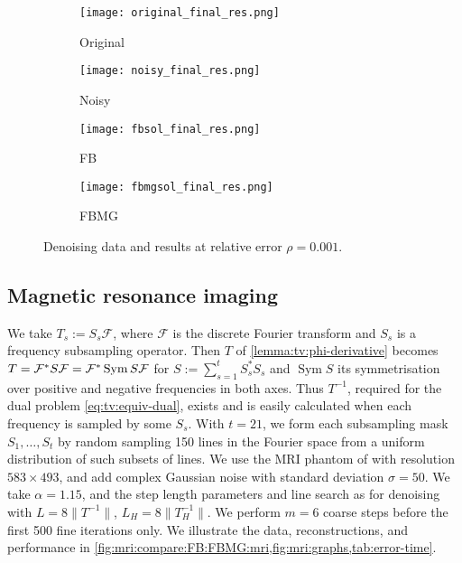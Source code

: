 \documentclass[a4paper,english]{jnsao}
\theoremstyle{definition}
\numberwithin{algorithm}{section}
\def\norm#1{\|#1\|}
\def\defeq{:=}
\DeclareMathOperator{\Sym}{Sym}
\let\Re\relax\DeclareMathOperator{\Re}{Re}
\def\relerr{\rho}
\begin{document}
\begin{figure}[t]
    \centering
    \begin{subfigure}{.2\textwidth}
        \centering
        \texttt{[image: original\_final\_res.png]}
        \caption{Original}
        \label{fig:original:image}
    \end{subfigure}%
    \begin{subfigure}{.2\textwidth}
        \centering
        \texttt{[image: noisy\_final\_res.png]}
        \caption{Noisy}
        \label{fig:noisy:image}
    \end{subfigure}
    \begin{subfigure}{.2\textwidth}
        \centering
        \texttt{[image: fbsol\_final\_res.png]}
        \caption{FB}
        \label{fig:fb:solution:image}
    \end{subfigure}%
    \begin{subfigure}{.2\textwidth}
        \centering
        \texttt{[image: fbmgsol\_final\_res.png]}
        \caption{FBMG}
        \label{fig:fbmg:solution:image}
    \end{subfigure}%
    \caption{Denoising data and results at relative error $\relerr= 0.001$.
    }
    \label{fig:denoising:compare:FB:FBMG}
\end{figure}

\subsection{Magnetic resonance imaging}
\label{sec:numerical:mri}

We take $T_s \defeq S_s\mathcal{F}$, where $\mathcal{F}$ is the discrete Fourier transform and $S_s$ is a frequency subsampling operator. Then $T$ of \cref{lemma:tv:phi-derivative} becomes
$
    T = \Re \mathcal{F}^* S \mathcal{F} = \mathcal{F}^* \Sym S \mathcal{F}
$
for $S \defeq \sum _{s=1}^t S_s^* S_s$ and $\Sym S$ its symmetrisation over positive and negative frequencies in both axes.
Thus $T^{-1}$, required for the dual problem \eqref{eq:tv:equiv-dual}, exists and is easily calculated when each frequency is sampled by some $S_s$.
With $t=21$, we form each subsampling mask $S_1,\ldots,S_t$ by random sampling 150 lines in the Fourier space from a uniform distribution of such subsets of lines.
We use the MRI phantom of \cite{belzunce2018high} with resolution $583\times 493$, and add complex Gaussian noise with standard deviation $\sigma = 50$.
We take $\alpha = 1.15$, and the step length parameters and line search as for denoising with $L = 8\norm{T^{-1}}$, $L_H = 8 \norm{T_H^{-1}}$.
We perform $m=6$ coarse steps before the first 500 fine iterations only.
We illustrate the data, reconstructions, and performance in \cref{fig:mri:compare:FB:FBMG:mri,fig:mri:graphs,tab:error-time}.
\end{document}
